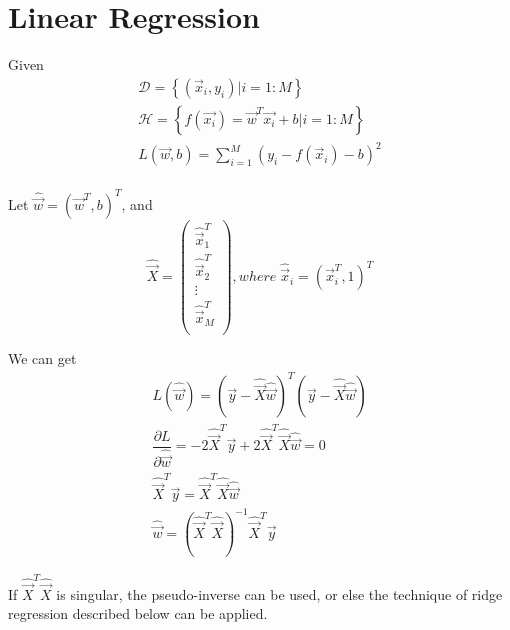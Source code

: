\section{Linear Regression}
Given 
\begin{equation}
\begin{array}{lcl}
\mathcal{D}=\left\{(\vec{x}_i,y_i) | i=1:M\right\} \\
\mathcal{H}=\left\{f(\vec{x_i})=\vec{w}^T\vec{x_i}+b | i=1:M\right\}\\
L(\vec{w},b)=\sum\limits_{i=1}^{M} \left(y_i-f(\vec{x}_i)-b\right)^2\\
\end{array}
\end{equation}

Let $\widehat{\vec{w}}=\left(\vec{w}^T,b\right)^T$,  and
\begin{equation}
\widehat{\vec{X}}=\left(\begin{array}{lcr}
\widehat{\vec{x}}_1^T\\
\widehat{\vec{x}}_2^T\\
\vdots \\
\widehat{\vec{x}}_M^T\\
\end{array}
\right), where\; \widehat{\vec{x}}_i=\left(\vec{x}_i^T,1\right)^T
\end{equation}

We can get
\begin{equation}
\begin{array}{lcr}
L(\widehat{\vec{w}})=\left(\vec{y}-\widehat{\vec{X}}\widehat{\vec{w}}\right)^T\left(\vec{y}-\widehat{\vec{X}}\widehat{\vec{w}}\right)\\
\dfrac{\partial L}{\partial{\widehat{\vec{w}}}}=-2\widehat{\vec{X}}^T\vec{y}+2\widehat{\vec{X}}^T\widehat{\vec{X}}\widehat{\vec{w}}=0\\
\widehat{\vec{X}}^T\vec{y}=\widehat{\vec{X}}^T\widehat{\vec{X}}\widehat{\vec{w}}\\
\widehat{\vec{w}}=\left(\widehat{\vec{X}}^T\widehat{\vec{X}}\right)^{-1}\widehat{\vec{X}}^T\vec{y}
\end{array}
\end{equation}

If $\widehat{\vec{X}}^T\widehat{\vec{X}}$ is singular, the pseudo-inverse can be used, or else the technique of ridge regression described below can be applied.
